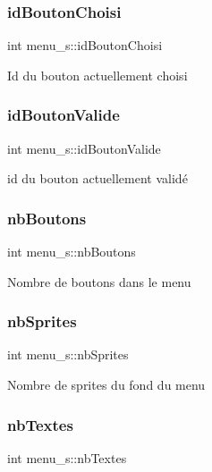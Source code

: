 \subsubsection{\texorpdfstring{id\+Bouton\+Choisi}{idBoutonChoisi}}
{\footnotesize\ttfamily int menu\+\_\+s\+::id\+Bouton\+Choisi}

Id du bouton actuellement choisi \mbox{\label{structmenu__s_a0fb7af2c7e862a54742c26c6e34f6a06}} 
\subsubsection{\texorpdfstring{id\+Bouton\+Valide}{idBoutonValide}}
{\footnotesize\ttfamily int menu\+\_\+s\+::id\+Bouton\+Valide}

id du bouton actuellement validé \mbox{\label{structmenu__s_a19e82f63dd8d79abd915eef8942983b7}} 
\subsubsection{\texorpdfstring{nb\+Boutons}{nbBoutons}}
{\footnotesize\ttfamily int menu\+\_\+s\+::nb\+Boutons}

Nombre de boutons dans le menu \mbox{\label{structmenu__s_a799866db5fd1be6862202346d260333d}} 
\subsubsection{\texorpdfstring{nb\+Sprites}{nbSprites}}
{\footnotesize\ttfamily int menu\+\_\+s\+::nb\+Sprites}

Nombre de sprites du fond du menu \mbox{\label{structmenu__s_afdbe31467b3f6d712b7f3b0a783987de}} 
\subsubsection{\texorpdfstring{nb\+Textes}{nbTextes}}
{\footnotesize\ttfamily int menu\+\_\+s\+::nb\+Textes}

